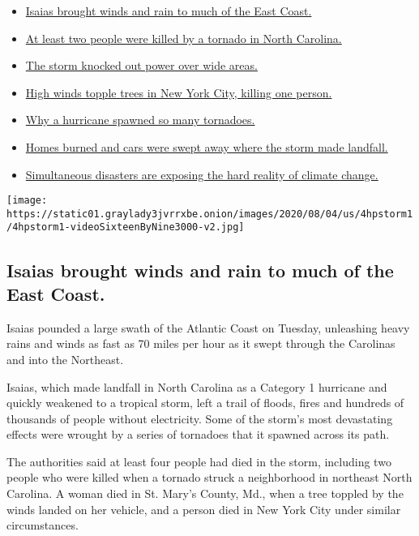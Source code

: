 \begin{itemize}
\tightlist
\item
  \protect\hyperlink{link-38d68049}{Isaias brought winds and rain to
  much of the East Coast.}
\item
  \protect\hyperlink{link-7961bdbc}{At least two people were killed by a
  tornado in North Carolina.}
\item
  \protect\hyperlink{link-3480f4a1}{The storm knocked out power over
  wide areas.}
\item
  \protect\hyperlink{link-2673c54}{High winds topple trees in New York
  City, killing one person.}
\item
  \protect\hyperlink{link-5275f1d1}{Why a hurricane spawned so many
  tornadoes.}
\item
  \protect\hyperlink{link-5066ef1c}{Homes burned and cars were swept
  away where the storm made landfall.}
\item
  \protect\hyperlink{link-665175e7}{Simultaneous disasters are exposing
  the hard reality of climate change.}
\end{itemize}

\texttt{[image: https://static01.graylady3jvrrxbe.onion/images/2020/08/04/us/4hpstorm1/4hpstorm1-videoSixteenByNine3000-v2.jpg]}

\hypertarget{isaias-brought-winds-and-rain-to-much-of-the-east-coast}{%
\subsection{Isaias brought winds and rain to much of the East
Coast.}\label{isaias-brought-winds-and-rain-to-much-of-the-east-coast}}

Isaias pounded a large swath of the Atlantic Coast on Tuesday,
unleashing heavy rains and winds as fast as 70 miles per hour as it
swept through the Carolinas and into the Northeast.

Isaias, which made landfall in North Carolina as a Category 1 hurricane
and quickly weakened to a tropical storm, left a trail of floods, fires
and hundreds of thousands of people without electricity. Some of the
storm's most devastating effects were wrought by a series of tornadoes
that it spawned across its path.

The authorities said at least four people had died in the storm,
including two people who were killed when a tornado struck a
neighborhood in northeast North Carolina. A woman died in St. Mary's
County, Md., when a tree toppled by the winds landed on her vehicle, and
a person died in New York City under similar circumstances.


